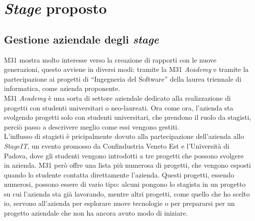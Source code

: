 \chapter{\textit{Stage} proposto}
\label{chap:stage-proposto}

\section{Gestione aziendale degli \textit{stage}}\label{sec:stage-management}\noindent
M31 mostra molto interesse verso la creazione di rapporti con le nuove generazioni, questo avviene in diversi modi: tramite la M31 \textit{Academy} e tramite la partecipazione ai progetti di ``Ingegneria del Software'' della laurea triennale di informatica, come azienda proponente.\\
M31 \textit{Academy} è una sorta di settore aziendale dedicato alla realizzazione di progetti con studenti universitari o neo-laureati. Ora come ora, l'azienda sta svolgendo progetti solo con studenti universitari, che prendono il ruolo da stagisti, perciò passo a descrivere meglio come essi vengono gestiti.\\
L'influsso di stagisti è pricipalmente dovuto alla partecipazione dell'azienda allo \textit{StageIT}, un evento promosso da Confindustria Veneto Est e l'Università di Padova, dove gli studenti vengono introdotti a tre progetti che possono svolgere in azienda. M31 però offre una lista più numerosa di progetti, che vengono esposti quando lo studente contatta direttamente l'azienda.
Questi progetti, essendo numerosi, possono essere di vario tipo: alcuni pongono lo stagista in un progetto su cui l'azienda sta già lavorando, mentre altri progetti, come quello che ho scelto io, servono all'azienda per esplorare nuove tecnologie o per prepararsi per un progetto aziendale che non ha ancora avuto modo di iniziare.

